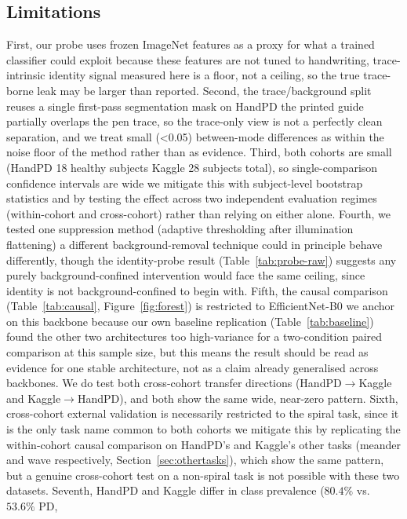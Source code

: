 \documentclass[3p,final,10pt]{elsarticle}
\let\oldsubsection\subsection
\renewcommand{\subsection}{\FloatBarrier\oldsubsection}
\begin{document}
\subsection{Limitations}
\label{sec:limitations}
First, our probe uses frozen ImageNet features as a proxy for what a
trained classifier could exploit because these features are not tuned to
handwriting, trace-intrinsic identity signal measured here is a floor, not
a ceiling, so the true trace-borne leak may be larger than reported.
Second, the trace/background split reuses a single first-pass segmentation
mask on HandPD the printed guide partially overlaps the pen trace, so the
trace-only view is not a perfectly clean separation, and we treat small
(\textless0.05) between-mode differences as within the noise floor of the
method rather than as evidence. Third, both cohorts are small (HandPD 18
healthy subjects Kaggle 28 subjects total), so single-comparison
confidence intervals are wide we mitigate this with subject-level
bootstrap statistics and by testing the effect across two independent
evaluation regimes (within-cohort and cross-cohort) rather than relying on
either alone. Fourth, we tested one suppression method (adaptive
thresholding after illumination flattening) a different background-removal
technique could in principle behave differently, though the identity-probe
result (Table~\ref{tab:probe-raw}) suggests any purely background-confined
intervention would face the same ceiling, since identity is not
background-confined to begin with. Fifth, the causal comparison
(Table~\ref{tab:causal}, Figure~\ref{fig:forest})
is restricted to EfficientNet-B0 we anchor on this backbone because our
own baseline replication (Table~\ref{tab:baseline}) found the other two
architectures too high-variance for a
two-condition paired comparison at this sample size, but this means the
result should be read as evidence for one stable architecture, not as a
claim already generalised across backbones. We do test both cross-cohort
transfer directions (HandPD$\rightarrow$Kaggle and Kaggle$\rightarrow$HandPD),
and both show the same wide, near-zero pattern. Sixth, cross-cohort
external validation is necessarily restricted to the spiral task, since it
is the only task name common to both cohorts we mitigate this by
replicating the within-cohort causal comparison on HandPD's and Kaggle's
other tasks (meander and wave respectively, Section~\ref{sec:othertasks}),
which show the same pattern, but a genuine cross-cohort test on a
non-spiral task is not possible with these two datasets. Seventh, HandPD
and Kaggle differ in class prevalence ($80.4\%$ vs.\ $53.6\%$ PD,
\end{document}
